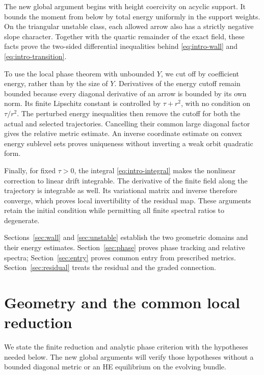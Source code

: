 \documentclass[11pt]{amsart}
\theoremstyle{definition}
\theoremstyle{remark}
\begin{document}
The new global argument begins with height coercivity on
acyclic support. It bounds the moment from below by total
energy uniformly in the support weights. On the triangular
unstable class, each allowed arrow also has a strictly
negative slope character. Together with the quartic
remainder of the exact field, these facts prove the
two-sided differential inequalities behind
\eqref{eq:intro-wall} and \eqref{eq:intro-transition}.

To use the local phase theorem with unbounded $Y$, we cut
off by coefficient energy, rather than by the size of $Y$.
Derivatives of the energy cutoff remain bounded because
every diagonal derivative of an arrow is bounded by its
own norm. Its finite Lipschitz constant is controlled by
$\tau+r^2$, with no condition on $\tau/r^2$. The perturbed
energy inequalities then remove the cutoff for both the
actual and selected trajectories. Cancelling their common
large diagonal factor gives the relative metric estimate.
An inverse coordinate estimate on convex energy sublevel
sets proves uniqueness without inverting a weak orbit
quadratic form.

Finally, for fixed $\tau>0$, the integral
\eqref{eq:intro-integral} makes the nonlinear correction
to linear drift integrable. The derivative of the finite
field along the trajectory is integrable as well. Its
variational matrix and inverse therefore converge, which
proves local invertibility of the residual map. These
arguments retain the initial condition while permitting
all finite spectral ratios to degenerate.

Sections~\ref{sec:wall} and \ref{sec:unstable} establish the
two geometric domains and their energy estimates.
Section~\ref{sec:phase} proves phase tracking and relative
spectra; Section~\ref{sec:entry} proves common entry from
prescribed metrics. Section~\ref{sec:residual} treats the
residual and the graded connection.

\section{Geometry and the common local reduction}\label{sec:setup}

We state the finite reduction and analytic phase criterion with
the hypotheses needed below. The new global arguments will verify
those hypotheses without a bounded diagonal metric or an HE
equilibrium on the evolving bundle.
\end{document}
